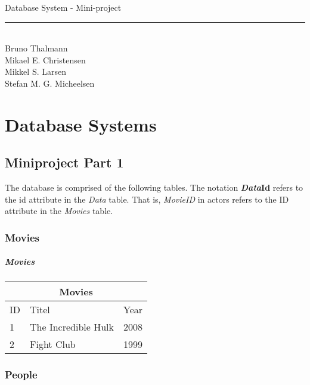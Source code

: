 
\newcommand{\HRule}{\rule{\linewidth}{0.5mm}}


\begin{titlepage}
\centering
{\LARGE Database System - Mini-project}
\HRule \\[0.5cm]
Bruno Thalmann\\
			Mikael E. Christensen\\
			Mikkel S. Larsen\\
			Stefan M. G. Micheelsen
\end{titlepage}

\chapter*{Database Systems}

\section{Miniproject Part 1}
The database is comprised of the following tables.
The notation \textbf{\textit{Data}Id} refers to the id attribute in the \textit{Data} table.
That is, \textit{MovieID} in actors refers to the ID attribute in the \textit{Movies} table.

\subsection{Movies}

\paragraph{Movies}
\begin{center}
\begin{tabular}{|l|l|l|}
\hline
\multicolumn{3}{|c|}{Movies} \\ \hline
ID & Titel & Year \\ \hline
1 & The Incredible Hulk & 2008 \\ \hline
2 & Fight Club & 1999 \\ \hline
\end{tabular}
\end{center}

\subsection{People}

